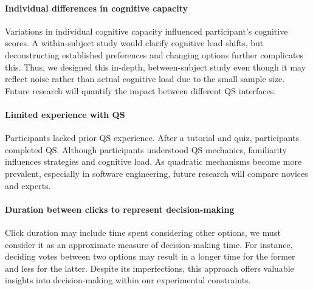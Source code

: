\paragraph{Individual differences in cognitive capacity}
Variations in individual cognitive capacity influenced participant's cognitive scores. A within-subject study would clarify cognitive load shifts, but deconstructing established preferences and changing options further complicates this. Thus, we designed this in-depth, between-subject study even though it may reflect noise rather than actual cognitive load due to the small sample size. Future research will quantify the impact between different QS interfaces.

\paragraph{Limited experience with QS}
Participants lacked prior QS experience. After a tutorial and quiz, participants completed QS. Although participants understood QS mechanics, familiarity influences strategies and cognitive load. As quadratic mechanisms become more prevalent, especially in software engineering, future research will compare novices and experts.

\paragraph{Duration between clicks to represent decision-making}
Click duration may include time spent considering other options, we must consider it as an approximate measure of decision-making time. For instance, deciding votes between two options may result in a longer time for the former and less for the latter. Despite its imperfections, this approach offers valuable insights into decision-making within our experimental constraints.



